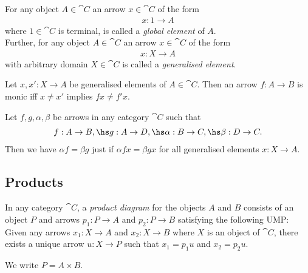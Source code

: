 \documentclass{article}
\begin{document}
\begin{definition}
    For any object $A\in\cat C$ an arrow $x\in\cat C$ of the form
    \begin{align*}
        x: 1 \to A
    \end{align*}
    where $1\in\cat C$ is terminal, is called a \emph{global element}
    of $A$.\\
    Further, for any object $A\in\cat C$ an arrow $x\in\cat C$ of the
    form
    \begin{align*}
        x: X\to A
    \end{align*} 
    with arbitrary domain $X\in\cat C$ is called a \emph{generalised element}.
\end{definition}

\begin{lemma}
    Let $x,x': X\to A$ be generalised elements of $A\in\cat C$. Then an arrow
    $f:A\to B$ is monic iff $x\not=x'$ implies $fx\not=f'x$.
\end{lemma}

\begin{lemma}
    Let $f,g,\alpha,\beta$ be arrows in any category $\cat C$ such that
    \begin{align*}
        f:A\to B,\hs g:A\to D,\hs \alpha:B\to C,\hs \beta:D\to C.
    \end{align*}
    Then we have $\alpha f=\beta g$ just if $\alpha f x = \beta g x$ for all generalised
    elements $x:X\to A$.
\end{lemma}

\subsection{Products}

\begin{definition}
    In any category $\cat C$, a \emph{product diagram} for the objects $A$
    and $B$ consists of an object $P$ and arrows $p_1:P\to A$ and $p_2:P\to B$
    satisfying the following UMP: Given any arrows $x_1:X\to A$ and $x_2:X\to B$
    where $X$ is an object of $\cat C$, there exists a unique arrow $u:X\to P$
    such that $x_1=p_1u$ and $x_2=p_2u$.
    \begin{center}
    \end{center}
    We write $P=A\times B$.
\end{definition}
\end{document}
